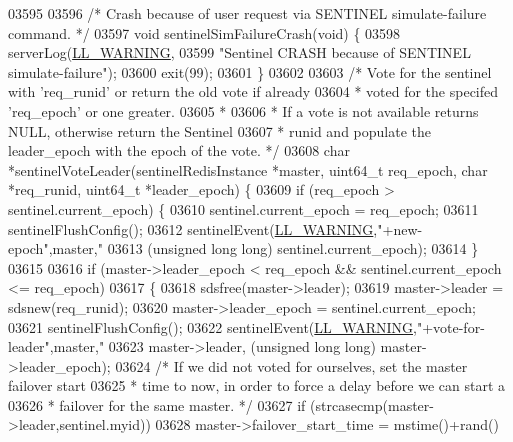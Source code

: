 \begin{DoxyCode}
{{{{{{{{{{{{{{{{{{{{{{{{{{{{{{{{{{{{{{{{{{{{{{{{{{{{{{{{{{{{{{{{{{{{{{{{{{{{{{{{03595 
03596 \textcolor{comment}{/* Crash because of user request via SENTINEL simulate-failure command. */}
03597 \textcolor{keywordtype}{void} sentinelSimFailureCrash(\textcolor{keywordtype}{void}) \{
03598     serverLog(\hyperlink{server_8h_a31229b9334bba7d6be2a72970967a14b}{LL\_WARNING},
03599         \textcolor{stringliteral}{"Sentinel CRASH because of SENTINEL simulate-failure"});
03600     exit(99);
03601 \}
03602 
03603 \textcolor{comment}{/* Vote for the sentinel with 'req\_runid' or return the old vote if already}
03604 \textcolor{comment}{ * voted for the specifed 'req\_epoch' or one greater.}
03605 \textcolor{comment}{ *}
03606 \textcolor{comment}{ * If a vote is not available returns NULL, otherwise return the Sentinel}
03607 \textcolor{comment}{ * runid and populate the leader\_epoch with the epoch of the vote. */}
03608 \textcolor{keywordtype}{char} *sentinelVoteLeader(sentinelRedisInstance *master, uint64\_t req\_epoch, \textcolor{keywordtype}{char} *req\_runid, uint64\_t 
      *leader\_epoch) \{
03609     \textcolor{keywordflow}{if} (req\_epoch > sentinel.current\_epoch) \{
03610         sentinel.current\_epoch = req\_epoch;
03611         sentinelFlushConfig();
03612         sentinelEvent(\hyperlink{server_8h_a31229b9334bba7d6be2a72970967a14b}{LL\_WARNING},\textcolor{stringliteral}{"+new-epoch"},master,\textcolor{stringliteral}{"%
03613             (\textcolor{keywordtype}{unsigned} \textcolor{keywordtype}{long} \textcolor{keywordtype}{long}) sentinel.current\_epoch);
03614     \}
03615 
03616     \textcolor{keywordflow}{if} (master->leader\_epoch < req\_epoch && sentinel.current\_epoch <= req\_epoch)
03617     \{
03618         sdsfree(master->leader);
03619         master->leader = sdsnew(req\_runid);
03620         master->leader\_epoch = sentinel.current\_epoch;
03621         sentinelFlushConfig();
03622         sentinelEvent(\hyperlink{server_8h_a31229b9334bba7d6be2a72970967a14b}{LL\_WARNING},\textcolor{stringliteral}{"+vote-for-leader"},master,\textcolor{stringliteral}{"%
03623             master->leader, (\textcolor{keywordtype}{unsigned} \textcolor{keywordtype}{long} \textcolor{keywordtype}{long}) master->leader\_epoch);
03624         \textcolor{comment}{/* If we did not voted for ourselves, set the master failover start}
03625 \textcolor{comment}{         * time to now, in order to force a delay before we can start a}
03626 \textcolor{comment}{         * failover for the same master. */}
03627         \textcolor{keywordflow}{if} (strcasecmp(master->leader,sentinel.myid))
03628             master->failover\_start\_time = mstime()+rand()%
}}}}}}}}}}}}}}}}}}}}}}}}}}}}}}}}}}}}}}}}}}}}}}}}}}}}}}}}}}}}}}}}}}}}}}}}}}}}}}}}}}
\end{DoxyCode}
